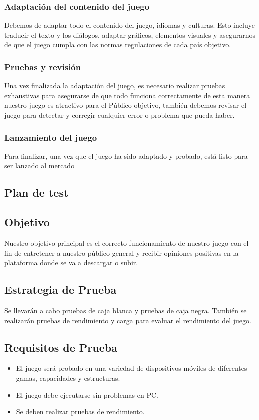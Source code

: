 \subsubsection{Adaptación del contenido del juego}
Debemos de adaptar todo el contenido del juego, idiomas y culturas. Esto incluye traducir el texto y los diálogos, adaptar gráficos, elementos visuales y asegurarnos de que el juego cumpla con las normas regulaciones de cada país objetivo.
\subsubsection{Pruebas y revisión}
Una vez finalizada la adaptación del juego, es necesario realizar pruebas exhaustivas para asegurarse de que todo funciona correctamente de esta manera nuestro juego es atractivo para el Público objetivo, también debemos revisar el juego para detectar y corregir cualquier error o problema que pueda haber.
\subsubsection{Lanzamiento del juego}
Para finalizar, una vez que el juego ha sido adaptado y probado, está listo para ser lanzado al mercado

\subsection{Plan de test}

\subsection{Objetivo}
Nuestro objetivo principal es el correcto funcionamiento de nuestro juego con el fin de entretener a nuestro público general y recibir opiniones positivas en la plataforma donde se va a descargar o subir.

\subsection{Estrategia de Prueba}
Se llevarán a cabo pruebas de caja blanca y pruebas de caja negra. También se realizarán pruebas de rendimiento y carga para evaluar el rendimiento del juego.

\subsection{Requisitos de Prueba}
\begin{itemize}
	\item El juego será probado en una variedad de dispositivos móviles de diferentes gamas, capacidades y estructuras.
	\item El juego debe ejecutarse sin problemas en PC.
	\item Se deben realizar pruebas de rendimiento.
\end{itemize}

